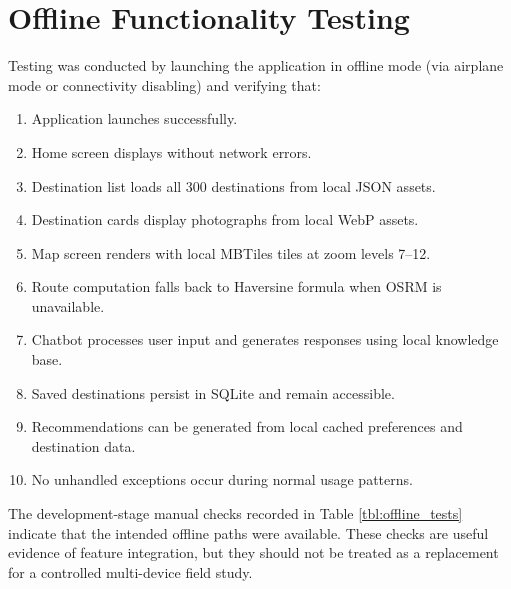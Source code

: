 \documentclass[12pt,a4paper,oneside]{report}
\begin{document}
\section{Offline Functionality Testing}
\label{sec:offline_testing}

Testing was conducted by launching the application in offline mode (via airplane mode or connectivity disabling) and verifying that:

\begin{enumerate}
\item Application launches successfully.
\item Home screen displays without network errors.
\item Destination list loads all 300 destinations from local JSON assets.
\item Destination cards display photographs from local WebP assets.
\item Map screen renders with local MBTiles tiles at zoom levels 7--12.
\item Route computation falls back to Haversine formula when OSRM is unavailable.
\item Chatbot processes user input and generates responses using local knowledge base.
\item Saved destinations persist in SQLite and remain accessible.
\item Recommendations can be generated from local cached preferences and destination data.
\item No unhandled exceptions occur during normal usage patterns.
\end{enumerate}

The development-stage manual checks recorded in Table \ref{tbl:offline_tests} indicate that the intended offline paths were available. These checks are useful evidence of feature integration, but they should not be treated as a replacement for a controlled multi-device field study.
\end{document}
